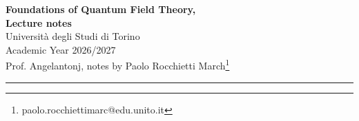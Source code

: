 \documentclass[a4paper,11pt]{book}
\begin{document}
\pagestyle{empty}
\begin{center}
\Large{\textbf{Foundations of Quantum Field Theory,\\ Lecture notes}}
\vspace{0.4cm}
\normalsize
\\ Università degli Studi di Torino\\Academic Year 2026/2027 \\Prof. Angelantonj,
notes by Paolo Rocchietti March\footnote{paolo.rocchiettimarc@edu.unito.it} \\

\vspace{0.1cm}
\medskip
\normalsize
\end{center}
\vspace{0.4cm}
{\color{gray}\hrule}
\tableofcontents
\newpage
\pagestyle{body}









\end{document}
